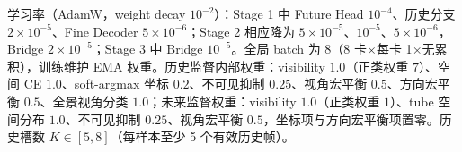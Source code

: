 \documentclass[10pt]{ctexart}
\begin{document}
学习率（AdamW，weight decay $10^{-2}$）：Stage 1 中 Future Head $10^{-4}$、历史分支 $2\times10^{-5}$、Fine Decoder $5\times10^{-6}$；Stage 2 相应降为 $5\times10^{-5}$、$10^{-5}$、$5\times10^{-6}$，Bridge $2\times10^{-5}$；Stage 3 中 Bridge $10^{-5}$。全局 batch 为 8（8 卡$\times$每卡 1$\times$无累积），训练维护 EMA 权重。历史监督内部权重：visibility $1.0$（正类权重 $7$）、空间 CE $1.0$、soft-argmax 坐标 $0.2$、不可见抑制 $0.25$、视角宏平衡 $0.5$、方向宏平衡 $0.5$、全景视角分类 $1.0$；未来监督权重：visibility $1.0$（正类权重 $1$）、tube 空间分布 $1.0$、不可见抑制 $0.25$、视角宏平衡 $0.5$，坐标项与方向宏平衡项置零。历史槽数 $K\in[5,8]$（每样本至少 5 个有效历史帧）。
\end{document}
